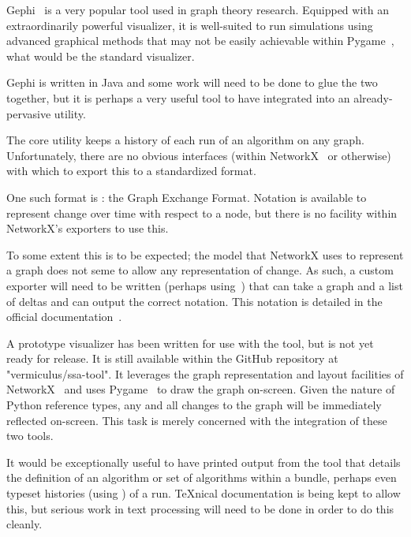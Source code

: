 \begin{task}
  \label{task:gephi-glue}
  Gephi~\autocite{gephi} is a very popular tool used in graph theory research.
  Equipped with an extraordinarily powerful visualizer,
    it is well-suited to run simulations using advanced graphical methods
    that may not be easily achievable within Pygame~\autocite{pygame},
    what would be the standard visualizer.
  
  Gephi is written in Java and some work will need to be done
    to glue the two together, but it is perhaps a very useful tool to have
    integrated into an already-pervasive utility.
\end{task}

\begin{task}
  \label{task:anigexf}
  The core utility keeps a history of each run of an algorithm on any graph.
  Unfortunately, there are no obvious interfaces
    (within NetworkX~\autocite{hagberg:networkx} or otherwise)
    with which to export this to a standardized format.

  One such format is : the Graph Exchange Format.
  Notation is available to represent change over time with respect to a node,
    but there is no facility within NetworkX's exporters to use this.

  To some extent this is to be expected; the model that NetworkX uses to represent a graph
    does not seme to allow any representation of change.
  As such, a custom exporter will need to be written (perhaps using~\autocite{pygexf}) that
    can take a graph and a list of deltas and can output the correct notation.
  This notation is detailed in the official documentation~\autocite{gexf}.
\end{task}

\begin{task}
  \label{task:gui-visualizer}
  A prototype visualizer has been written for use with the tool,
    but is not yet ready for release.
  It is still available within the GitHub repository at "vermiculus/ssa-tool".
  It leverages the graph representation and layout facilities of NetworkX~\autocite{hagberg:networkx}
    and uses Pygame~\autocite{pygame} to draw the graph on-screen.
  Given the nature of Python reference types, any and all changes to the graph
    will be immediately reflected on-screen.
  This task is merely concerned with the integration of these two tools.
\end{task}

\begin{task}
  \label{task:texport}
  It would be exceptionally useful to have printed output from the
  tool that details the definition of an algorithm or set of
  algorithms within a bundle, perhaps even typeset histories (using
  \TikZ) of a run.  \TeX nical documentation is being kept to allow
  this, but serious work in text processing will need to be done in
  order to do this cleanly.
\end{task}

